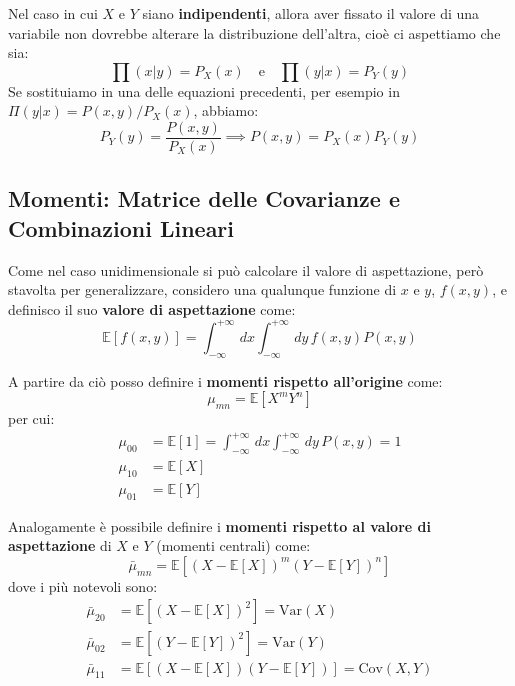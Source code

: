 \documentclass[openany,a4paper,12pt]{book}
\theoremstyle{remark}
\begin{document}
Nel caso in cui $X$ e $Y$ siano \textbf{indipendenti}, allora aver fissato il valore di una variabile non dovrebbe alterare la distribuzione dell'altra, cioè ci aspettiamo che sia:
\begin{equation}
    \prod(x|y) = P_X(x) \quad \text{e} \quad \prod(y|x) = P_Y(y)
\end{equation}
Se sostituiamo in una delle equazioni precedenti, per esempio in $\Pi(y|x) = P(x,y)/P_X(x)$, abbiamo:
\begin{equation}
    P_Y(y) = \frac{P(x,y)}{P_X(x)} \implies P(x,y) = P_X(x)P_Y(y)
\end{equation}



\subsection{Momenti: Matrice delle Covarianze e Combinazioni Lineari}

Come nel caso unidimensionale si può calcolare il valore di aspettazione, però stavolta per generalizzare, considero una qualunque funzione di $x$ e $y$, $f(x,y)$, e definisco il suo \textbf{valore di aspettazione} come:
\begin{equation}
    \mathbb{E}[f(x,y)] = \int_{-\infty}^{+\infty} \,dx \int_{-\infty}^{+\infty} \,dy \, f(x,y) P(x,y)
\end{equation}

A partire da ciò posso definire i \textbf{momenti rispetto all'origine} come:
\begin{equation}
    \mu_{mn} = \mathbb{E}[X^m Y^n]
\end{equation}
per cui:
\begin{align*}
    \mu_{00} &= \mathbb{E}[1] = \int_{-\infty}^{+\infty} \,dx \int_{-\infty}^{+\infty} \,dy \, P(x,y) = 1 \\
    \mu_{10} &= \mathbb{E}[X] \\
    \mu_{01} &= \mathbb{E}[Y]
\end{align*}

Analogamente è possibile definire i \textbf{momenti rispetto al valore di aspettazione} di $X$ e $Y$ (momenti centrali) come:
\begin{equation}
    \bar{\mu}_{mn} = \mathbb{E}\left[ (X - \mathbb{E}[X])^m (Y - \mathbb{E}[Y])^n \right]
\end{equation}
dove i più notevoli sono:
\begin{align*}
    \bar{\mu}_{20} &= \mathbb{E}\left[ (X - \mathbb{E}[X])^2 \right] = \text{Var}(X) \\
    \bar{\mu}_{02} &= \mathbb{E}\left[ (Y - \mathbb{E}[Y])^2 \right] = \text{Var}(Y) \\
    \bar{\mu}_{11} &= \mathbb{E}\left[ (X - \mathbb{E}[X])(Y - \mathbb{E}[Y]) \right] = \text{Cov}(X,Y)
\end{align*}
\end{document}
